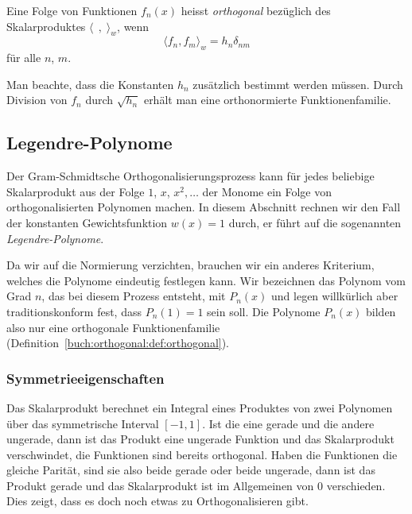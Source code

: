 \begin{definition}
\label{buch:orthogonal:def:orthogonal}
Eine Folge von Funktionen $f_n(x)$ heisst {\em orthogonal} bezüglich des
%
Skalarproduktes $\langle\,\;,\;\rangle_w$, wenn
\[
\langle f_n,f_m\rangle_w = h_n \delta_{nm}
\]
für alle $n$, $m$.
\end{definition}

Man beachte, dass die Konstanten $h_n$ zusätzlich bestimmt werden müssen.
Durch Division von $f_n$ durch $\sqrt{h_n}$ erhält man eine
orthonormierte Funktionenfamilie.

%
%
\subsection{Legendre-Polynome
\label{buch:orthogonal:subsection:legendre-polynome}}
Der Gram-Schmidtsche Orthogonalisierungsprozess kann für jedes beliebige
Skalarprodukt aus der Folge $1$, $x$, $x^2,\dots$ der Monome ein
Folge von orthogonalisierten Polynomen machen.
In diesem Abschnitt rechnen wir den Fall der konstanten Gewichtsfunktion
$w(x)=1$ durch, er führt auf die sogenannten {\em Legendre-Polynome}.

Da wir auf die Normierung verzichten, brauchen wir ein anderes
Kriterium, welches die Polynome eindeutig festlegen kann.
Wir bezeichnen das Polynom vom Grad $n$, das bei diesem Prozess
entsteht, mit $P_n(x)$ und legen willkürlich aber traditionskonform
fest, dass $P_n(1)=1$ sein soll.
Die Polynome $P_n(x)$ bilden also nur eine orthogonale Funktionenfamilie
(Definition~\ref{buch:orthogonal:def:orthogonal}).

%
%
\subsubsection{Symmetrieeigenschaften}
%
Das Skalarprodukt berechnet ein Integral eines Produktes von zwei
Polynomen über das symmetrische Interval $[-1,1]$.
Ist die eine gerade und die andere ungerade, dann ist das
Produkt eine ungerade Funktion und das Skalarprodukt verschwindet,
die Funktionen sind bereits orthogonal.
Haben die Funktionen die gleiche Parität, 
sind sie also beide gerade oder beide ungerade, dann ist das Produkt
gerade und das Skalarprodukt ist im Allgemeinen von $0$ verschieden.
Dies zeigt, dass es doch noch etwas zu Orthogonalisieren gibt.

